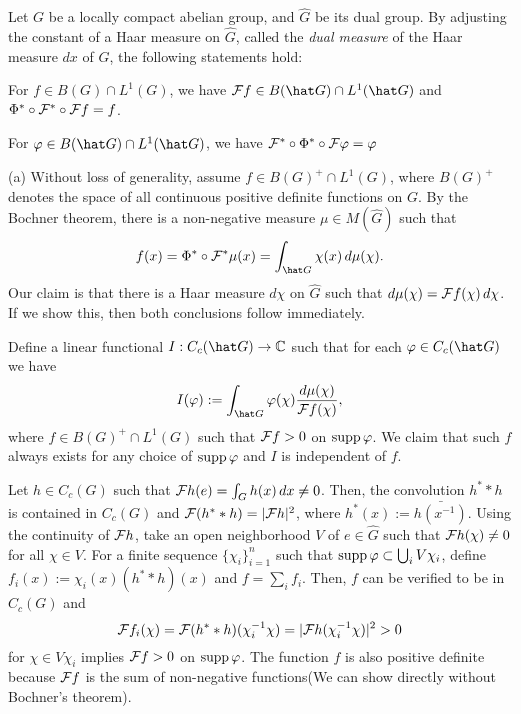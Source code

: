 \documentclass{../../small}
\begin{document}
\begin{thm}
Let $G$ be a locally compact abelian group, and $\hat G$ be its dual group.
By adjusting the constant of a Haar measure on $\hat G$, called the \emph{dual measure} of the Haar measure $dx$ of $G$, the following statements hold:
\begin{parts}
\item For $f\in B(G)\cap L^1(G)$, we have $\cF f\in B(\hat G)\cap L^1(\hat G)$ and $\Phi^*\circ\mathcal{F}^*\circ\mathcal{F} f=f$.
\item For $\f\in B(\hat G)\cap L^1(\hat G)$, we have $\mathcal{F}^*\circ\Phi^*\circ\mathcal{F}\varphi=\varphi$
\end{parts}
\end{thm}
\begin{pf}
(a)
Without loss of generality, assume $f\in B(G)^+\cap L^1(G)$, where $B(G)^+$ denotes the space of all continuous positive definite functions on $G$.
By the Bochner theorem, there is a non-negative measure $\mu\in M(\hat G)$ such that
\[f(x)=\Phi^*\circ\cF^*\mu(x)=\int_{\hat G}\chi(x)\,d\mu(\chi).\]
Our claim is that there is a Haar measure $d\chi$ on $\hat G$ such that $d\mu(\chi)=\mathcal{F} f(\chi)\,d\chi$.
If we show this, then both conclusions follow immediately.

Define a linear functional $I:C_c(\hat G)\to\C$ such that for each $\f\in C_c(\hat G)$ we have
\[I(\f):=\int_{\hat G}\f(\chi)\frac{d\mu(\chi)}{\cF f(\chi)},\]
where $f\in B(G)^+\cap L^1(G)$ such that $\mathcal{F} f>0$ on $\operatorname{supp}\varphi$.
We claim that such $f$ always exists for any choice of $\operatorname{supp}\varphi$ and $I$ is independent of $f$.

Let $h\in C_c(G)$ such that $\mathcal{F} h(e)=\int_Gh(x)\,dx\ne0$.
Then, the convolution $h^**h$ is contained in $C_c(G)$ and $\mathcal{F}(h^**h)=|\mathcal{F} h|^2$, where $h^*(x):=\bar{h(x^{-1})}$.
Using the continuity of $\mathcal{F} h$, take an open neighborhood $V$ of $e\in\hat G$ such that $\mathcal{F} h(\chi)\ne0$ for all $\chi\in V$.
For a finite sequence $\{\chi_i\}_{i=1}^n$ such that $\operatorname{supp}\varphi\subset\bigcup_iV\chi_i$, define $f_i(x):=\chi_i(x)(h^**h)(x)$ and $f=\sum_if_i$.
Then, $f$ can be verified to be in $C_c(G)$ and
\[\mathcal{F} f_i(\chi)=\mathcal{F}(h^**h)(\chi_i^{-1}\chi)=|\mathcal{F} h(\chi_i^{-1}\chi)|^2>0\]
for $\chi\in V\chi_i$ implies $\mathcal{F} f>0$ on $\operatorname{supp}\varphi$.
The function $f$ is also positive definite because $\mathcal{F} f$ is the sum of non-negative functions(We can show directly without Bochner's theorem).


\end{pf}
\end{document}
